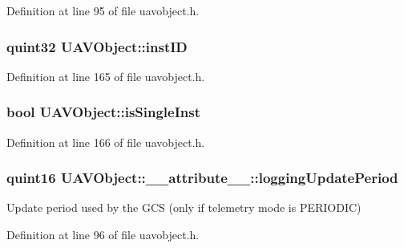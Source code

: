\-Definition at line 95 of file uavobject.\-h.

\hypertarget{group___u_a_v_objects_plugin_gad8d656542a04e9fbef607ff178f6d9d3}{
\subsubsection[{inst\-I\-D}]{\setlength{\rightskip}{0pt plus 5cm}quint32 {\bf \-U\-A\-V\-Object\-::inst\-I\-D}}}\label{group___u_a_v_objects_plugin_gad8d656542a04e9fbef607ff178f6d9d3}


\-Definition at line 165 of file uavobject.\-h.

\hypertarget{group___u_a_v_objects_plugin_gaa279cad3a000cc930e7f386672426bcb}{
\subsubsection[{is\-Single\-Inst}]{\setlength{\rightskip}{0pt plus 5cm}bool {\bf \-U\-A\-V\-Object\-::is\-Single\-Inst}}}\label{group___u_a_v_objects_plugin_gaa279cad3a000cc930e7f386672426bcb}


\-Definition at line 166 of file uavobject.\-h.

\hypertarget{group___u_a_v_objects_plugin_gad4c54f8af5beeb9dc2bbe402c9f01299}{
\subsubsection[{logging\-Update\-Period}]{\setlength{\rightskip}{0pt plus 5cm}quint16 {\bf \-U\-A\-V\-Object\-::\-\_\-\-\_\-attribute\-\_\-\-\_\-\-::logging\-Update\-Period}}}\label{group___u_a_v_objects_plugin_gad4c54f8af5beeb9dc2bbe402c9f01299}
\-Update period used by the \-G\-C\-S (only if telemetry mode is \-P\-E\-R\-I\-O\-D\-I\-C) 

\-Definition at line 96 of file uavobject.\-h.

